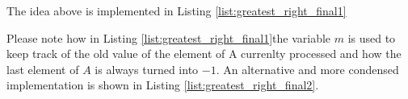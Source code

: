 The idea above is implemented in Listing \ref{list:greatest_right_final1}

	

Please note how in Listing \ref{list:greatest_right_final1}the variable $m$ is used to keep track of the old value of the element of A currenlty processed and how the  last element of $A$ is always turned into $-1$.
An alternative and more condensed implementation  is shown in Listing \ref{list:greatest_right_final2}.

	